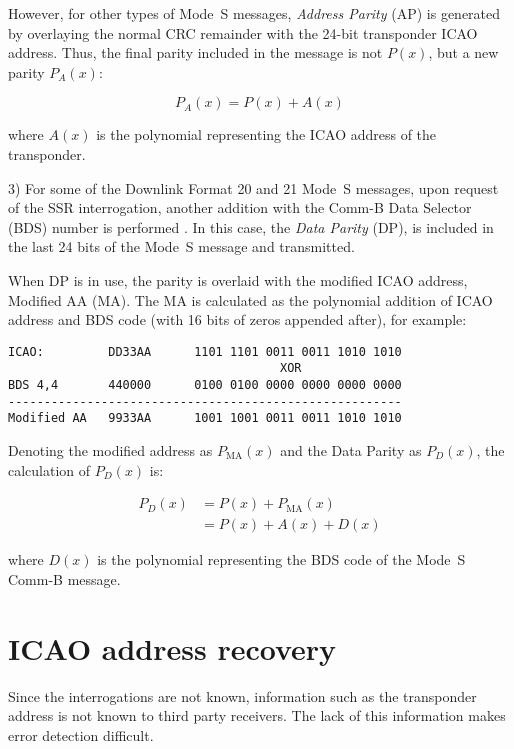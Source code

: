 However, for other types of Mode~S messages, \emph{Address Parity} (AP) is generated by overlaying the normal CRC remainder with the 24-bit transponder ICAO address. Thus, the final parity included in the message is not $P(x)$, but a new parity $P_A(x)$:

\begin{equation}
  P_A(x) = P(x) + A(x)
\end{equation}

\noindent where $A(x)$ is the polynomial representing the ICAO address of the transponder.

3) For some of the Downlink Format 20 and 21 Mode~S messages, upon request of the SSR interrogation, another addition with the Comm-B Data Selector (BDS) number is performed \cite{gertz1984}. In this case, the \emph{Data Parity} (DP), is included in the last 24 bits of the Mode~S message and transmitted.

When DP is in use, the parity is overlaid with the modified ICAO address, Modified AA (MA). The MA is calculated as the polynomial addition of ICAO address and BDS code (with 16 bits of zeros appended after), for example:

\begin{verbatim}
ICAO:         DD33AA      1101 1101 0011 0011 1010 1010
                                      XOR
BDS 4,4       440000      0100 0100 0000 0000 0000 0000
-------------------------------------------------------
Modified AA   9933AA      1001 1001 0011 0011 1010 1010
\end{verbatim}


Denoting the modified address as $P_\mathrm{MA}(x)$ and the Data Parity as $P_D(x)$, the calculation of $P_D(x)$ is:

\begin{equation}
  \begin{split}
    P_D(x) &= P(x) + P_\mathrm{MA}(x) \\
     &= P(x) + A(x) + D(x)
  \end{split}
\end{equation}

\noindent where $D(x)$ is the polynomial representing the BDS code of the Mode~S Comm-B message.


\section{ICAO address recovery}

Since the interrogations are not known, information such as the transponder address is not known to third party receivers. The lack of this information makes error detection difficult.

